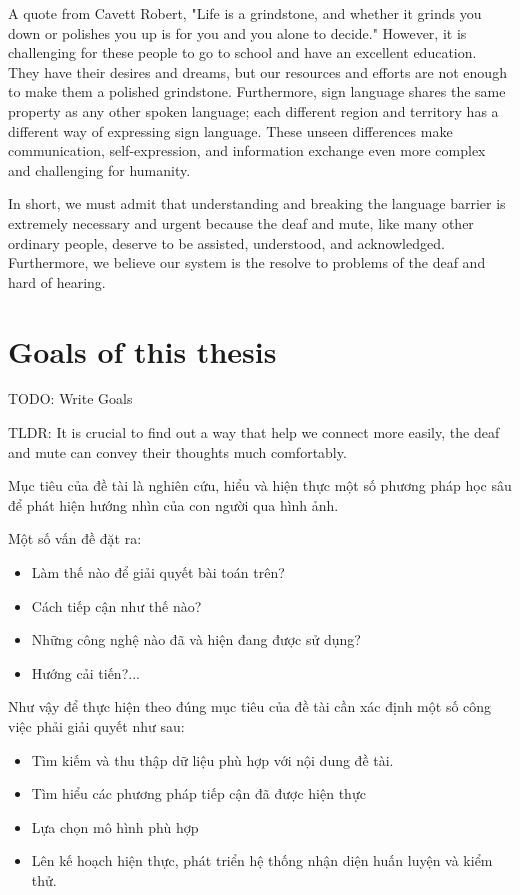 A quote from Cavett Robert, "Life is a grindstone, and whether it grinds you down or polishes you up is for you and you alone to decide." However, it is challenging for these people to go to school and have an excellent education. They have their desires and dreams, but our resources and efforts are not enough to make them a polished grindstone. Furthermore, sign language shares the same property as any other spoken language; each different region and territory has a different way of expressing sign language. These unseen differences make communication, self-expression, and information exchange even more complex and challenging for humanity.

In short, we must admit that understanding and breaking the language barrier is extremely necessary and urgent because the deaf and mute, like many other ordinary people, deserve to be assisted, understood, and acknowledged. Furthermore, we believe our system is the resolve to problems of the deaf and hard of hearing.

\section{Goals of this thesis}

TODO: Write Goals

TLDR: It is crucial to find out a way that help we connect more easily, the deaf and mute can convey their thoughts much comfortably.

Mục tiêu của đề tài là nghiên cứu, hiểu và hiện thực một số phương pháp học sâu để phát hiện hướng nhìn của con người qua hình ảnh.

Một số vấn đề đặt ra: 
\begin{itemize}
	\item Làm thế nào để giải quyết bài toán trên?
	\item Cách tiếp cận như thế nào?
	\item Những công nghệ nào đã và hiện đang được sử dụng?
	\item Hướng cải tiến?...
\end{itemize}

Như vậy để thực hiện theo đúng mục tiêu của đề tài cần xác định một số công việc phải giải quyết như sau:
\begin{itemize}
	\item Tìm kiếm và thu thập dữ liệu phù hợp với nội dung đề tài.
	\item Tìm hiểu các phương pháp tiếp cận đã được hiện thực
	\item Lựa chọn mô hình phù hợp
	\item Lên kế hoạch hiện thực, phát triển hệ thống nhận diện huấn luyện và kiểm thử.
\end{itemize}

